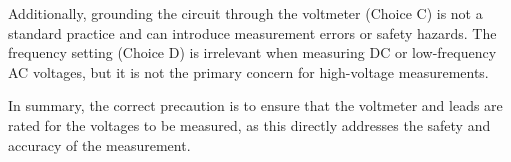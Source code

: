 Additionally, grounding the circuit through the voltmeter (Choice C) is not a standard practice and can introduce measurement errors or safety hazards. The frequency setting (Choice D) is irrelevant when measuring DC or low-frequency AC voltages, but it is not the primary concern for high-voltage measurements.

In summary, the correct precaution is to ensure that the voltmeter and leads are rated for the voltages to be measured, as this directly addresses the safety and accuracy of the measurement.

